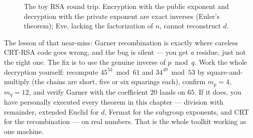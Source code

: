\begin{figure}[H]
\centering
{}
\caption{The toy RSA round trip. Encryption with the public exponent and decryption with the
private exponent are exact inverses (Euler's theorem); Eve, lacking the factorization of $n$,
cannot reconstruct $d$.}
\label{ch04:fig-rsa-roundtrip}
\end{figure}

\begin{walkbox}
The lesson of that near-miss: Garner recombination is exactly where careless CRT-RSA code goes
wrong, and the bug is silent --- you get \emph{a} residue, just not the right one. The fix is to use
the genuine inverse of $p \bmod q$. Work the whole decryption yourself: recompute
$45^{53}\bmod 61$ and $34^{49}\bmod 53$ by square-and-multiply (the chains are short, five or six
squarings each), confirm $m_p = 4$, $m_q = 12$, and verify Garner with the coefficient $20$ lands on
$65$. If it does, you have personally executed every theorem in this chapter --- division with
remainder, extended Euclid for $d$, Fermat for the subgroup exponents, and CRT for the recombination
--- on real numbers. That is the whole toolkit working as one machine.
\end{walkbox}


